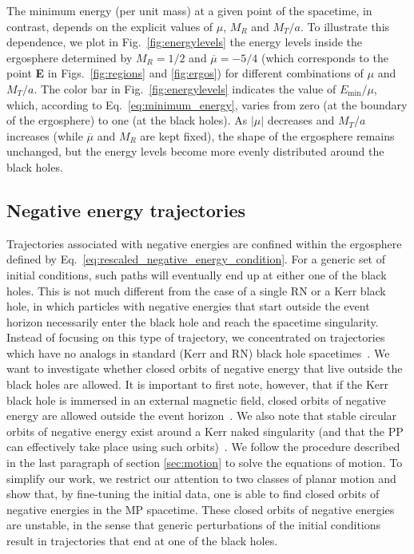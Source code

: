 The minimum energy (per unit mass) at a given point of the spacetime, in contrast, depends on the explicit values of $\mu$, $M_R$ and $M_T/a$. To illustrate this dependence, we plot in Fig.~\ref{fig:energylevels} the energy levels inside the ergosphere determined by $M_R=1/2$ and $\overline \mu = -5/4$ (which corresponds to the point \textbf{E} in Figs.~\ref{fig:regions} and \ref{fig:ergos}) for different combinations of $\mu$ and $M_T/a$. The color bar in Fig.~\ref{fig:energylevels} indicates the value of $E_{\mathrm{min}}/\mu$, which, according to Eq.~\eqref{eq:minimum_energy}, varies from zero (at the boundary of the ergosphere) to one (at the black holes). As $|\mu|$ decreases and $M_T/a$ increases (while $\overline \mu$ and $M_R$ are kept fixed), the shape of the ergosphere remains unchanged, but the energy levels become more evenly distributed around the black holes.

\subsection{Negative energy trajectories}
\label{sec:neg_energy}

Trajectories associated with negative energies are confined within the ergosphere defined by Eq.~\eqref{eq:rescaled_negative_energy_condition}. For a generic set of initial conditions, such paths will eventually end up at either one of the black holes. This is not much different from the case of a single RN or a Kerr black hole, in which particles with negative energies that start outside the event horizon necessarily enter the black hole and reach the spacetime singularity. Instead of focusing on this type of trajectory, we concentrated on trajectories which have no analogs in standard (Kerr and RN) black hole spacetimes~\cite{Grib:2013hxa,Zaslavskii:2020crn}. We want to investigate whether closed orbits of negative energy that live outside the black holes are allowed. It is important to first note, however, that if the Kerr black hole is immersed in an external magnetic field, closed orbits of negative energy are allowed outside the event horizon~\cite{PRASANA1982,FELICE2004}. We also note that stable circular orbits of negative energy exist around a Kerr naked singularity (and that the \ac{PP} can effectively take place using such orbits)~\cite{STUCHLIK1980}. We follow the procedure described in the last paragraph of section \ref{sec:motion} to solve the equations of motion. To simplify our work, we restrict our attention to two classes of planar motion and show that, by fine-tuning the initial data, one is able to find closed orbits of negative energies in the \ac{MP} spacetime. These closed orbits of negative energies are unstable, in the sense that generic perturbations of the initial conditions result in trajectories that end at one of the black holes.

